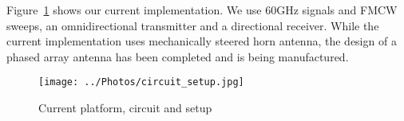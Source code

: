 





Figure~\ref{fig:circuit_setup} shows our current implementation. We use 60GHz signals and FMCW sweeps, an omnidirectional transmitter and a directional receiver. While the current implementation uses mechanically steered horn antenna, the design of a phased array antenna has been completed and is being manufactured. 

\begin{figure}
	\centering
	\texttt{[image: ../Photos/circuit\_setup.jpg]}
	\caption{Current platform, circuit and setup}
	\label{fig:circuit_setup}
\end{figure}

